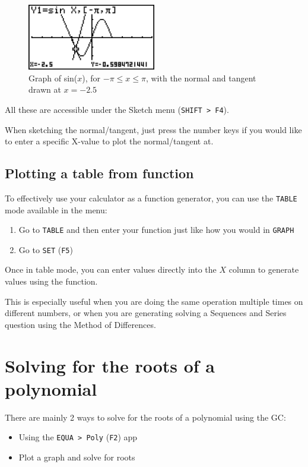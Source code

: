 \documentclass[a5paper]{memoir}
\def\code#1{\texttt{#1}}
\def\Ftwo{(\code{F2}) }
\def\Ffive{(\code{F5}) }
\begin{document}
\begin{figure}[h]
	\centering
	\includegraphics[width=0.5\textwidth]{normtan_sinx}
	\caption{Graph of sin($x$), for $-\pi \leq x \leq \pi$, with the normal and tangent drawn at $x=-2.5$}
\end{figure}

All these are accessible under the Sketch menu (\code{SHIFT > F4}).

When sketching the normal/tangent, just press the number keys if you would like to enter a specific X-value to plot the normal/tangent at.

\subsection{Plotting a table from function} \label{sec:plottable}
To effectively use your calculator as a function generator, you can use the \code{TABLE} mode available in the menu:
\begin{enumerate}
	\item Go to \code{TABLE} and then enter your function just like how you would in \code{GRAPH}
	\item Go to \code{SET} \Ffive
\end{enumerate}

Once in table mode, you can enter values directly into the $X$ column to generate values using the function. 

This is especially useful when you are doing the same operation multiple times on different numbers, or when you are generating solving a Sequences and Series question using the Method of Differences.

\section{Solving for the roots of a polynomial}
There are mainly 2 ways to solve for the roots of a polynomial using the GC:
\begin{itemize}
	\item Using the \code{EQUA > Poly} \Ftwo app
	\item Plot a graph and solve for roots
\end{itemize}
\end{document}
